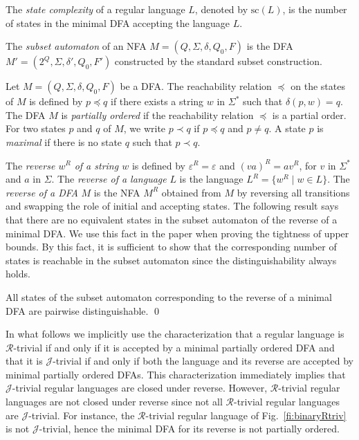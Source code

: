 \documentclass[runningheads]{llncs}
\newcommand{\eps}{\varepsilon}
\newcommand{\R}{$\mathcal{R}$}
\newcommand{\J}{$\mathcal{J}$}
\renewcommand{\sc}{\mathrm{sc}}
\begin{document}
  The \emph{state complexity} of a regular language $L$, denoted by $\sc(L)$, is the number of states in the minimal DFA accepting the language $L$.

  The {\em subset automaton\/} of an NFA $M=(Q,\Sigma,\delta,Q_0,F)$ is the DFA  $M'=(2^Q,\Sigma,\delta',Q_0,F')$ constructed by the standard subset construction.
  
  Let $M=(Q,\Sigma,\delta,Q_0,F)$ be a DFA. The reachability relation $\preceq$ on the states of $M$ is defined by $p\preceq q$ if there exists a string $w$ in $\Sigma^*$ such that $\delta(p,w)=q$. The DFA $M$ is {\em partially ordered\/} if the reachability relation $\preceq$ is a partial order. For two states $p$ and $q$ of $M$, we write $p \prec q$ if $p\preceq q$ and $p\ne q$. A state $p$ is {\em maximal\/} if there is no state $q$ such that $p\prec q$. 

  The \emph{reverse $w^R$ of a string $w$\/} is defined by $\eps^R=\eps$ and $(va)^R=av^R$, for $v$ in $\Sigma^*$ and $a$ in $\Sigma$. The \emph{reverse of a language\/} $L$ is the language $L^R=\{w^R\mid w\in L\}$. The \emph{reverse of a DFA\/} $M$ is the NFA $M^R$ obtained from $M$ by reversing all transitions and swapping the role of initial and accepting states. 
  The following result says that there are no equivalent states in the subset automaton of the reverse of a minimal DFA. We use this fact in the paper when proving the tightness of upper bounds. By this fact, it is sufficient to show that the corresponding number of states is reachable in the subset automaton since the distinguishability always holds.
  \begin{fact}[\cite{br63}]\label{le:equiv}
    All states of the subset automaton corresponding to  the reverse of a minimal DFA are pairwise distinguishable.
    \qed
  \end{fact}

  In what follows we implicitly use the characterization that a regular language is \R-trivial if and only if it is accepted by a minimal partially ordered DFA and that it is \J-trivial if and only if both the language and its reverse are accepted by minimal partially ordered DFAs. This characterization immediately implies that \J-trivial regular languages are closed under reverse. However, \R-trivial regular languages are not closed under reverse since not all \R-trivial regular languages are \J-trivial. For instance, the \R-trivial regular language of Fig.~\ref{fi:binaryRtriv} is not \J-trivial, hence the minimal DFA for its reverse is not partially ordered.
\end{document}
